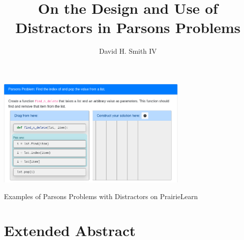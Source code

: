 \documentclass[authorversion,nonacm]{acmart}
\begin{document}


\title{On the Design and Use of Distractors in Parsons Problems}

\author{David H. Smith IV}


\begin{teaserfigure}
    \centering
    \includegraphics[width=0.70\textwidth]{imgs/parsons.png}
    \caption{Examples of Parsons Problems with Distractors on PrairieLearn}
\end{teaserfigure}

\maketitle

\section{Extended Abstract}
\end{document}

